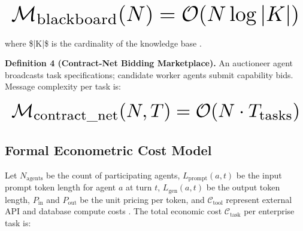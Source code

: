 \documentclass[10pt,twocolumn,letterpaper]{article}
\begin{document}
\begin{equation}
\resizebox{\columnwidth}{!}{$\displaystyle
\begin{aligned}
\mathcal{M}_{\text{blackboard}}(N) = \mathcal{O}(N \log |K|)
\end{aligned}
$}
\end{equation}












where \$|K|\$ is the cardinality of the knowledge base \cite{crossref_10_1145_3689096_3689462}.

\textbf{Definition 4 (Contract-Net Bidding Marketplace).} An auctioneer agent broadcasts task specifications; candidate worker agents submit capability bids. Message complexity per task is:












\begin{equation}
\resizebox{\columnwidth}{!}{$\displaystyle
\begin{aligned}
\mathcal{M}_{\text{contract\_net}}(N, T) = \mathcal{O}(N \cdot T_{\text{tasks}})
\end{aligned}
$}
\end{equation}















\subsection{Formal Econometric Cost Model}


Let $N_{\text{agents}}$ be the count of participating agents, $L_{\text{prompt}}(a, t)$ be the input prompt token length for agent $a$ at turn $t$, $L_{\text{gen}}(a, t)$ be the output token length, $P_{\text{in}}$ and $P_{\text{out}}$ be the unit pricing per token, and $\mathcal{C}_{\text{tool}}$ represent external API and database compute costs \cite{arxiv_2406_00584}. The total economic cost $\mathcal{C}_{\text{task}}$ per enterprise task is:
\end{document}
